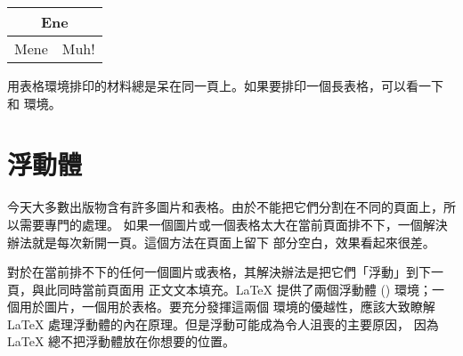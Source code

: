 \begin{example}
\begin{tabular}{|c|c|}
\hline
\multicolumn{2}{|c|}{Ene} \\
\hline
Mene & Muh! \\
\hline
\end{tabular}
\end{example}

用表格環境排印的材料總是呆在同一頁上。如果要排印一個長表格，可以看一下
  和  環境。

\section{浮動體}
今天大多數出版物含有許多圖片和表格。由於不能把它們分割在不同的頁面上，所以需要專門的處理。
如果一個圖片或一個表格太大在當前頁面排不下，一個解決辦法就是每次新開一頁。這個方法在頁面上留下
部分空白，效果看起來很差。

對於在當前排不下的任何一個圖片或表格，其解決辦法是把它們「浮動」到下一頁，與此同時當前頁面用
正文文本填充。\LaTeX{} 提供了兩個浮動體 () 環境；一個用於圖片，一個用於表格。要充分發揮這兩個
環境的優越性，應該大致瞭解 \LaTeX{} 處理浮動體的內在原理。但是浮動可能成為令人沮喪的主要原因，
因為 \LaTeX{} 總不把浮動體放在你想要的位置。

